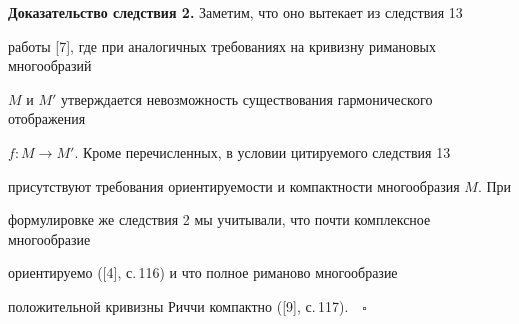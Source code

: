 \medskip





{\bf Доказательство следствия 2.} Заметим, что оно вытекает из следствия 13


работы [7], где при аналогичных требованиях на кривизну римановых многообразий


$M$ и $M'$ утверждается невозможность существования гармонического отображения


$f:M \to M'$. Кроме перечисленных, в условии цитируемого следствия 13


присутствуют требования ориентируемости и компактности многообразия $M$. При


формулировке же следствия 2 мы учитывали, что почти комплексное многообразие


ориентируемо ([4], с.\,116) и что полное риманово многообразие


положительной кривизны Риччи компактно ([9], с.\,117).$\quad\square$








